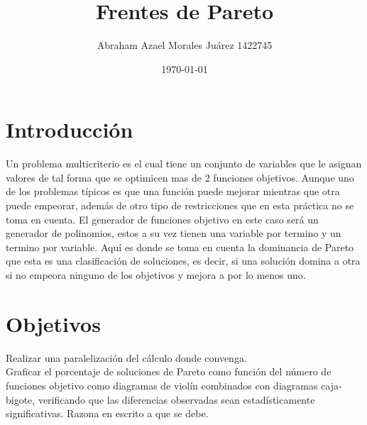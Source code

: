 \documentclass{article}
\author{Abraham Azael Morales Juárez  1422745}
\title{Frentes de Pareto}
\date{\today}
\begin{document}
\maketitle

\section{Introducción}
Un problema multicriterio es el cual tiene un conjunto de variables que le asignan valores de tal forma que se optimicen mas de 2 funciones objetivos. Aunque uno de los problemas típicos es que una función puede mejorar mientras que otra puede empeorar, además de otro tipo de restricciones que en esta práctica no se toma en cuenta\cite{REF1}. 
El generador de funciones objetivo en este caso será un generador de polinomios, estos a su vez tienen una variable por termino y un termino por variable.
Aquí es donde se toma en cuenta la dominancia de Pareto que esta es una clasificación de soluciones, es decir, si una solución domina a otra si no empeora ninguno de los objetivos y mejora a por lo menos uno\cite{REF1}.

\section{Objetivos}
Realizar una paralelización del cálculo donde convenga.\\
Graficar el porcentaje de soluciones de Pareto como función del número de funciones objetivo como diagramas de violín combinados con diagramas caja-bigote, verificando que las diferencias observadas sean estadísticamente significativas. Razona en escrito a que se debe.
\end{document}
